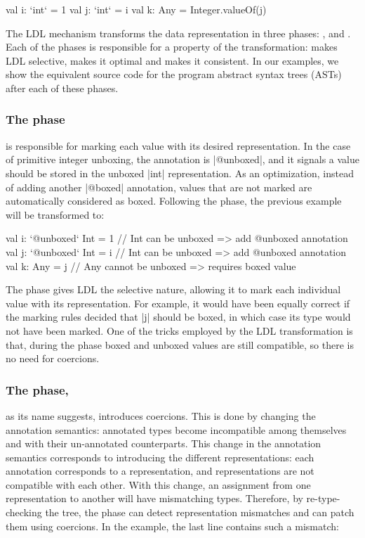 \begin{lstlisting-nobreak}
val i: `int` = 1
val j: `int` = i
val k: Any = Integer.valueOf(j)
\end{lstlisting-nobreak}

The LDL mechanism transforms the data representation in three phases: \inject{}, \coerce{} and \commit{}. Each of the phases is responsible for a property of the transformation: \inject{} makes LDL selective, \coerce{} makes it optimal and \commit{} makes it consistent. In our examples, we show the equivalent source code for the program abstract syntax trees (ASTs) after each of these phases.

\subsubsection{The \inject{} phase} is responsible for marking each value with its desired representation. In the case of primitive integer unboxing, the annotation is |@unboxed|, and it signals a value should be stored in the unboxed |int| representation. As an optimization, instead of adding another |@boxed| annotation, values that are not marked are automatically considered as boxed. Following the \inject{} phase, the previous example will be transformed to:

\begin{lstlisting-nobreak}
val i: `@unboxed` Int = 1 // Int can be unboxed => add @unboxed annotation
val j: `@unboxed` Int = i // Int can be unboxed => add @unboxed annotation
val k: Any = j                  // Any cannot be unboxed => requires boxed value
\end{lstlisting-nobreak}

The \inject{} phase gives LDL the selective nature, allowing it to mark each individual value with its representation. For example, it would have been equally correct if the marking rules decided that |j| should be boxed, in which case its type would not have been marked. One of the tricks employed by the LDL transformation is that, during the \inject{} phase boxed and unboxed values are still compatible, so there is no need for coercions.

\subsubsection{The \coerce{} phase,} as its name suggests, introduces coercions. This is done by changing the annotation semantics: annotated types become incompatible among themselves and with their un-annotated counterparts. This change in the annotation semantics corresponds to introducing the different representations: each annotation corresponds to a representation, and representations are not compatible with each other. With this change, an assignment from one representation to another will have mismatching types. Therefore, by re-type-checking the tree, the \coerce{} phase can detect representation mismatches and can patch them using coercions. In the example, the last line contains such a mismatch:

